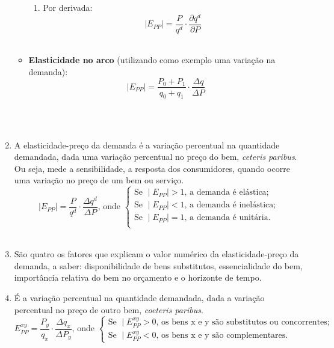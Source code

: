 \documentclass[a4paper, 12pt]{article}
\begin{document}
\begin{enumerate}
\begin{itemize}
\begin{enumerate}
			\item Por derivada: 
				$$\mid E_{PP}\mid = \dfrac{P}{q^d} \cdot \dfrac{\partial q^d}{\partial P}$$\\
		\end{enumerate}
		
		\item \textbf{Elasticidade no arco }(utilizando como exemplo uma variação na demanda):
			$$\mid E_{PP}\mid =  \dfrac{P_0 + P_1}{q_0 + q_1} \cdot \dfrac{\Delta q}{\Delta P}$$\\
	\end{itemize}
	\\

	\item A elasticidade-preço da demanda é a variação percentual na quantidade demandada, dada uma variação percentual no preço do bem, \textit{ceteris paribus}. Ou seja, mede a sensibilidade, a resposta dos consumidores, quando ocorre uma variação no preço de um bem ou serviço.
			$$\mid E_{PP}\mid = \dfrac{P}{q^d} \cdot \dfrac{\Delta q^d}{\Delta P} \textrm{, onde }
				\begin{cases}
				\textrm{Se } \mid E_{PP}\mid > 1 \textrm{, a demanda é elástica;}\\
				\textrm{Se } \mid E_{PP}\mid < 1 \textrm{, a demanda é inelástica;}\\
				\textrm{Se } \mid E_{PP}\mid = 1 \textrm{, a demanda é unitária.}\\
				\end{cases}$$
				\\

	\item São quatro os fatores que explicam o valor numérico da elasticidade-preço da demanda, a saber: disponibilidade de bens substitutos, essencialidade do bem, importância relativa do bem no orçamento e o horizonte de tempo.
	\\

	\item É a variação percentual na quantidade demandada, dada a variação percentual no preço de outro bem, \textit{coeteris paribus}.\\
	$$E_{PP}^{xy} = \dfrac{P_y}{q_x} \cdot \dfrac{\Delta q_x}{\Delta P_y} \textrm{, onde }
		\begin{cases}
		\textrm{Se } \mid E_{PP}^{xy} > 0 \textrm{, os bens x e y são substitutos ou concorrentes;}\\
		\textrm{Se } \mid E_{PP}^{xy} < 0 \textrm{, os bens x e y são complementares.}
		\end{cases}$$
		\\
	

\end{enumerate}
\end{document}
